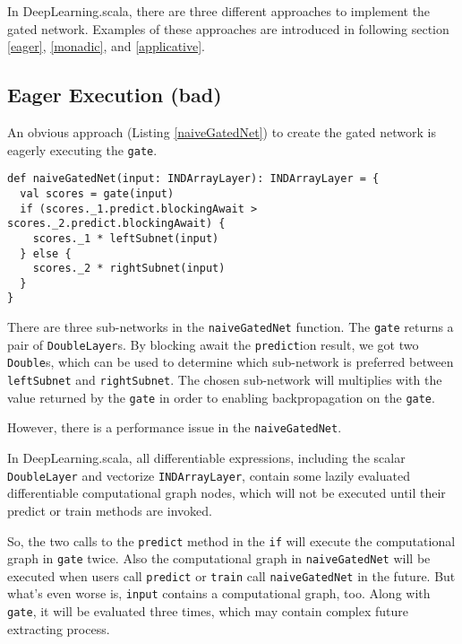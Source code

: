 In DeepLearning.scala, there are three different approaches to implement the gated network. Examples of these approaches are introduced in following section \ref{eager}, \ref{monadic}, and \ref{applicative}.

\subsection{Eager Execution (bad)\label{eager}}

An obvious approach (Listing \ref{naiveGatedNet}) to create the gated network is eagerly executing the \lstinline{gate}.

\begin{lstlisting}[float={htbp},caption={The eager execution implementation of gated network}, label={naiveGatedNet}]
def naiveGatedNet(input: INDArrayLayer): INDArrayLayer = {
  val scores = gate(input)
  if (scores._1.predict.blockingAwait > scores._2.predict.blockingAwait) {
    scores._1 * leftSubnet(input)
  } else {
    scores._2 * rightSubnet(input)
  }
}
\end{lstlisting}

There are three sub-networks in the \lstinline{naiveGatedNet} function. The \lstinline{gate} returns a pair of \lstinline{DoubleLayer}s. By blocking await the \lstinline{predict}ion result, we got two \lstinline{Double}s, which can be used to determine which sub-network is preferred between \lstinline{leftSubnet} and \lstinline{rightSubnet}. The chosen sub-network will multiplies with the value returned by the \lstinline{gate} in order to enabling backpropagation on the \lstinline{gate}.

However, there is a performance issue in the \lstinline{naiveGatedNet}.

In DeepLearning.scala, all differentiable expressions, including the scalar \lstinline{DoubleLayer} and vectorize \lstinline{INDArrayLayer}, contain some lazily evaluated differentiable \gls{computational graph} nodes, which will not be executed until their predict or train methods are invoked.

So, the two calls to the \lstinline{predict} method in the \lstinline{if} will execute the \gls{computational graph} in \lstinline{gate} twice. Also the \gls{computational graph} in \lstinline{naiveGatedNet} will be executed when users call \lstinline{predict} or \lstinline{train} call \lstinline{naiveGatedNet} in the future. But what's even worse is, \lstinline{input} contains a \gls{computational graph}, too. Along with \lstinline{gate}, it will be evaluated three times, which may contain complex future extracting process.

